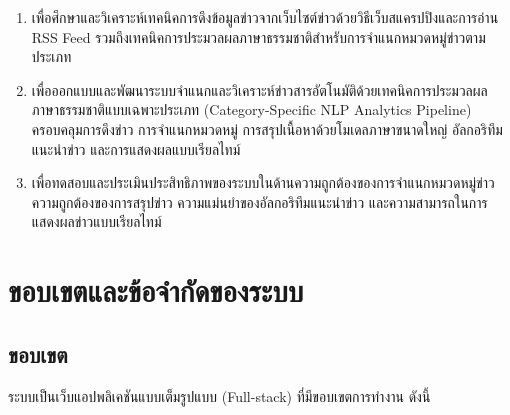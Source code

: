 \begin{enumerate}
    \item เพื่อศึกษาและวิเคราะห์เทคนิคการดึงข้อมูลข่าวจากเว็บไซต์ข่าวด้วยวิธีเว็บสแครปปิงและการอ่าน \\RSS Feed รวมถึงเทคนิคการประมวลผลภาษาธรรมชาติสำหรับการจำแนกหมวดหมู่ข่าวตามประเภท
    \item เพื่อออกแบบและพัฒนาระบบจำแนกและวิเคราะห์ข่าวสารอัตโนมัติด้วยเทคนิคการประมวลผลภาษาธรรมชาติแบบเฉพาะประเภท (Category-Specific NLP Analytics Pipeline) ครอบคลุมการดึงข่าว การจำแนกหมวดหมู่ การสรุปเนื้อหาด้วยโมเดลภาษาขนาดใหญ่ อัลกอริทึมแนะนำข่าว และการแสดงผลแบบเรียลไทม์
    \item เพื่อทดสอบและประเมินประสิทธิภาพของระบบในด้านความถูกต้องของการจำแนกหมวดหมู่ข่าว ความถูกต้องของการสรุปข่าว ความแม่นยำของอัลกอริทึมแนะนำข่าว และความสามารถในการแสดงผลข่าวแบบเรียลไทม์
\end{enumerate}

\section{ขอบเขตและข้อจำกัดของระบบ}

\subsection{ขอบเขต}

ระบบเป็นเว็บแอปพลิเคชันแบบเต็มรูปแบบ (Full-stack) ที่มีขอบเขตการทำงาน ดังนี้

